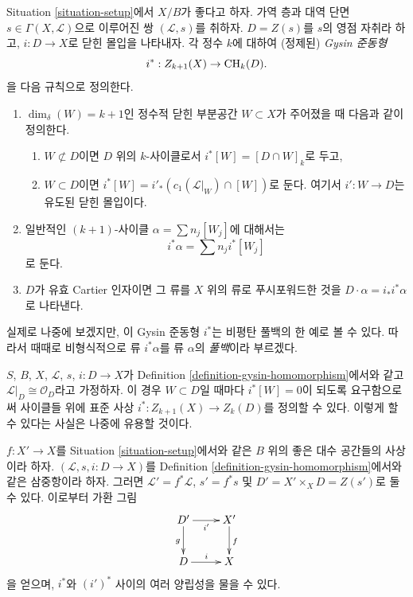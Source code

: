 \begin{definition}
\label{definition-gysin-homomorphism}
Situation \ref{situation-setup}에서 $X/B$가 좋다고 하자.
가역 층과 대역 단면 $s \in \Gamma(X, \mathcal{L})$으로 이루어진
쌍 $(\mathcal{L}, s)$를 취하자. $D = Z(s)$를 $s$의 영점 자취라 하고,
$i : D \to X$로 닫힌 몰입을 나타내자. 각 정수 $k$에 대하여
(정제된) {\it Gysin 준동형}
$$
i^* : Z_{k + 1}(X) \to \mathop{\mathrm{CH}}\nolimits_k(D).
$$
을 다음 규칙으로 정의한다.
\begin{enumerate}
\item $\dim_\delta(W) = k + 1$인 정수적 닫힌 부분공간
$W \subset X$가 주어졌을 때 다음과 같이 정의한다.
\begin{enumerate}
\item $W \not \subset D$이면 $D$ 위의 $k$-사이클로서
$i^*[W] = [D \cap W]_k$로 두고,
\item $W \subset D$이면
$i^*[W] = i'_*(c_1(\mathcal{L}|_W) \cap [W])$로 둔다. 여기서
$i' : W \to D$는 유도된 닫힌 몰입이다.
\end{enumerate}
\item 일반적인 $(k + 1)$-사이클 $\alpha = \sum n_j[W_j]$에 대해서는
$$
i^*\alpha = \sum n_j i^*[W_j]
$$
로 둔다.
\item $D$가 유효 Cartier 인자이면 그 류를 $X$ 위의 류로
푸시포워드한 것을 $D \cdot \alpha = i_*i^*\alpha$로 나타낸다.
\end{enumerate}
\end{definition}

\noindent
실제로 나중에 보겠지만, 이 Gysin 준동형 $i^*$는 비평탄 풀백의
한 예로 볼 수 있다. 따라서 때때로 비형식적으로 류 $i^*\alpha$를
류 $\alpha$의 {\it 풀백}이라 부르겠다.

\begin{remark}
\label{remark-on-cycles}
$S$, $B$, $X$, $\mathcal{L}$, $s$, $i : D \to X$가 Definition
\ref{definition-gysin-homomorphism}에서와 같고
$\mathcal{L}|_D \cong \mathcal{O}_D$라고 가정하자.
이 경우 $W \subset D$일 때마다 $i^*[W] = 0$이 되도록 요구함으로써
사이클들 위에 표준 사상 $i^* : Z_{k + 1}(X) \to Z_k(D)$를 정의할 수
있다. 이렇게 할 수 있다는 사실은 나중에 유용할 것이다.
\end{remark}

\begin{remark}
\label{remark-pullback-pairs}
$f : X' \to X$를 Situation \ref{situation-setup}에서와 같은
$B$ 위의 좋은 대수 공간들의 사상이라 하자.
$(\mathcal{L}, s, i : D \to X)$를 Definition
\ref{definition-gysin-homomorphism}에서와 같은 삼중항이라 하자.
그러면 $\mathcal{L}' = f^*\mathcal{L}$, $s' = f^*s$ 및
$D' = X' \times_X D = Z(s')$로 둘 수 있다. 이로부터 가환 그림
$$
\xymatrix{
D' \ar[d]_g \ar[r]_{i'} & X' \ar[d]^f \\
D \ar[r]^i & X
}
$$
을 얻으며, $i^*$와 $(i')^*$ 사이의 여러 양립성을 물을 수 있다.
\end{remark}

